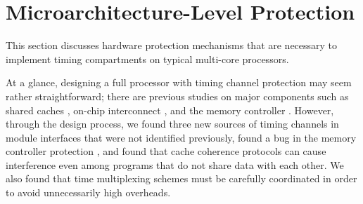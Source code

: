 \section{Microarchitecture-Level Protection}

This section discusses hardware protection mechanisms that are necessary
to implement timing compartments on typical multi-core processors.

At a glance, designing a full processor with timing channel
protection may seem rather straightforward; there are previous 
studies on major components such as 
shared caches \cite{percival}, 
on-chip interconnect \cite{yaonocs, surfnoc}, and the memory controller \cite{ushpca14}.
However, through the design process, we found three new sources of timing 
channels in module interfaces that were not identified previously, found a
bug in the memory controller protection \cite{ushpca14}, and found that cache 
coherence protocols can cause interference even among programs that do not 
share data with each other.
We also found that time multiplexing schemes
must be carefully coordinated in order to avoid 
unnecessarily high overheads. 

%
%
%
%

